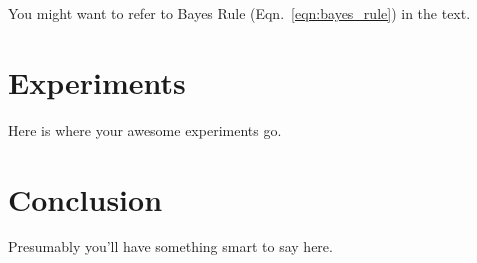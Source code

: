 \documentclass{article}
\begin{document}
You might want to refer to Bayes Rule (Eqn.~\ref{eqn:bayes_rule}) in the text.

\section{Experiments}

Here is where your awesome experiments go.

\section{Conclusion}

Presumably you'll have something smart to say here.

\begin{small}

 
\end{small}
\end{document}
